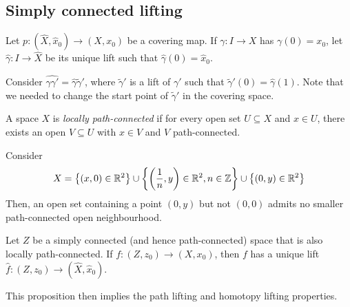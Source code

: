 \subsection{Simply connected lifting}
Let \( p \colon (\hat X, \hat x_0) \to (X, x_0) \) be a covering map.
If \( \gamma \colon I \to X \) has \( \gamma(0) = x_0 \), let \( \hat \gamma \colon I \to \hat X \) be its unique lift such that \( \hat \gamma(0) = \hat x_0 \).

Consider \( \widehat{\gamma\gamma'} = \hat\gamma\widetilde\gamma' \), where \( \widetilde\gamma' \) is a lift of \( \gamma' \) such that \( \widetilde\gamma'(0) = \hat\gamma(1) \).
Note that we needed to change the start point of \( \widetilde\gamma' \) in the covering space.
\begin{definition}
	A space \( X \) is \emph{locally path-connected} if for every open set \( U \subseteq X \) and \( x \in U \), there exists an open \( V \subseteq U \) with \( x \in V \) and \( V \) path-connected.
\end{definition}
\begin{example}
	Consider
	\[ X = \qty{(x,0) \in \mathbb R^2} \cup \qty{\qty(\frac{1}{n}, y) \in \mathbb R^2, n \in \mathbb Z} \cup \qty{(0,y) \in \mathbb R^2} \]
	Then, an open set containing a point \( (0,y) \) but not \( (0,0) \) admits no smaller path-connected open neighbourhood.
\end{example}
\begin{proposition}
	Let \( Z \) be a simply connected (and hence path-connected) space that is also locally path-connected.
	If \( f \colon (Z,z_0) \to (X,x_0) \), then \( f \) has a unique lift \( \hat f \colon (Z,z_0) \to (\hat X, \hat x_0) \).
\end{proposition}
\begin{remark}
	This proposition then implies the path lifting and homotopy lifting properties.
\end{remark}
